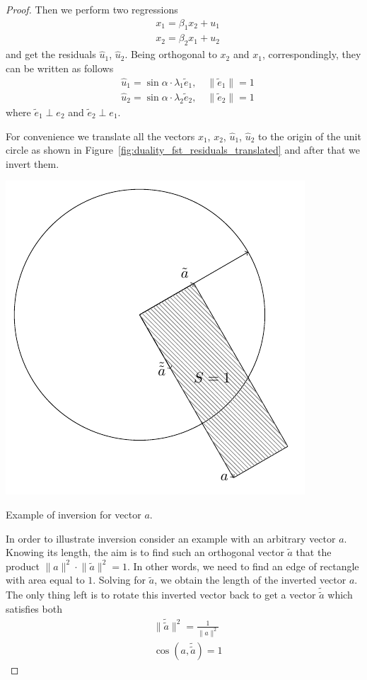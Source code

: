 \begin{proof}
Then we perform two regressions
\begin{align*}
&x_1 = \beta_1 x_2 + u_1 \\
&x_2 = \beta_2 x_1 + u_2
\end{align*}
and get the residuals $\hat{u}_1$, $\hat{u}_2$.
Being orthogonal to $x_2$ and $x_1$, correspondingly, they can be written as follows
\begin{align*}
&\hat{u}_1 = \sin \alpha \cdot \lambda_1 \tilde{e}_1, \quad \lVert \tilde{e}_1 \rVert = 1 \\
&\hat{u}_2 = \sin \alpha \cdot \lambda_2 \tilde{e}_2, \quad \lVert \tilde{e}_2 \rVert = 1
\end{align*}
where $\tilde{e}_1 \perp e_2$ and $\tilde{e}_2 \perp e_1$.

For convenience we translate all the vectors $x_1$, $x_2$, $\hat{u}_1$, $\hat{u}_2$
to the origin of the unit circle as shown in Figure~\ref{fig:duality_fst_residuals_translated}
and after that we invert them.

\begin{marginfigure}
\includegraphics[scale=0.7]{figures/02_duality_inversion.pdf}
\label{fig:duality_inversion}
\caption{Example of inversion for vector $a$.}
\end{marginfigure}

In order to illustrate inversion consider an example with an arbitrary vector $a$.
Knowing its length, the aim is to find such an orthogonal vector $\tilde a$
that the product $\lVert a \rVert^2 \cdot \lVert \tilde a \rVert^2 = 1$.
In other words, we need to find an edge of rectangle with area equal to $1$.
Solving for $\tilde a$, we obtain the length of the inverted vector $a$.
The only thing left is to rotate this inverted vector back
to get a vector $\tilde{\tilde a}$ which satisfies both
\begin{align*}
& \lVert \tilde{\tilde a} \rVert^2 = \frac{1}{\lVert a \rVert^2} \\
& \cos(a, \tilde{\tilde a}) = 1
\end{align*}


\end{proof}
